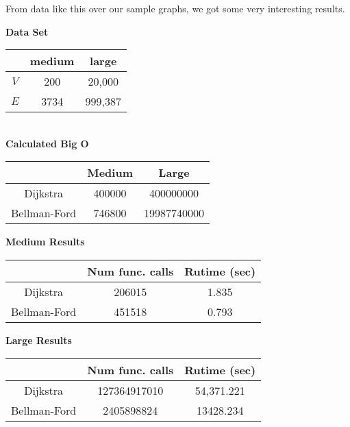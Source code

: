 \documentclass{article}
\begin{document}
From data like this over our sample graphs, we got some very interesting results. \\
\begin{multicols}{2}

\hspace{20 pt} \textbf{Data Set}\\
\centering
\begin{tabular}{||c|c|c||}
\hline
& medium & large \\
\hline
$V$ & 200 & 20,000\\
\hline
$E$ & 3734 & 999,387\\
\hline
\end{tabular}\\

\hspace{5 pt} \textbf{Calculated Big O}\\
\centering
\begin{tabular}{||c|c|c||}
\hline
& Medium & Large \\
\hline
Dijkstra & 400000 &400000000\\
\hline
Bellman-Ford & 746800  & 19987740000\\
\hline
\end{tabular}

\end{multicols}

\vspace{05 pt}

\begin{multicols}{2}
\hspace{20 pt} \textbf{Medium Results}\\
\centering
\begin{tabular}{||c|c|c||}
\hline
& Num func. calls & Rutime (sec) \\
\hline
Dijkstra & 206015 & 1.835\\
\hline
Bellman-Ford & 451518 & 0.793\\
\hline
\end{tabular}


\hspace{05 pt} \textbf{Large Results}\\
\centering
\begin{tabular}{||c|c|c||}
\hline
& Num func. calls & Rutime (sec) \\
\hline
Dijkstra & 127364917010 & 54,371.221 \\
\hline
Bellman-Ford & 2405898824 & 13428.234 \\
\hline
\end{tabular}
\end{multicols}
\end{document}
